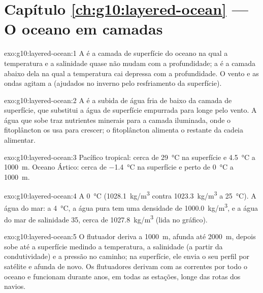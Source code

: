 \section*{Capítulo \ref{ch:g10:layered-ocean} --- O oceano em camadas}

\begin{solution}{exo:g10:layered-ocean:1}
A  é a camada de superfície do oceano na qual a
temperatura e a salinidade quase não mudam com a profundidade; a 
é a camada abaixo dela na qual a temperatura cai depressa com a
profundidade. O vento e as ondas agitam a  (ajudados no
inverno pelo resfriamento da superfície).
\end{solution}

\begin{solution}{exo:g10:layered-ocean:2}
A  é a subida de água fria de baixo da camada de superfície,
que substitui a água de superfície empurrada para longe pelo vento. A água
que sobe traz nutrientes minerais para a camada iluminada, onde o
fitoplâncton os usa para crescer; o fitoplâncton alimenta o restante da
cadeia alimentar.
\end{solution}

\begin{solution}{exo:g10:layered-ocean:3}
Pacífico tropical: cerca de \qty{29}{\degreeCelsius} na superfície e
\qty{4.5}{\degreeCelsius} a \qty{1000}{m}. Oceano Ártico: cerca de
\qty{-1.4}{\degreeCelsius} na superfície e perto de
\qty{0}{\degreeCelsius} a \qty{1000}{m}.
\end{solution}

\begin{solution}{exo:g10:layered-ocean:4}
A \qty{0}{\degreeCelsius} (\qty{1028.1}{kg/m^3} contra \qty{1023.3}{kg/m^3}
a \qty{25}{\degreeCelsius}). A água do mar: a \qty{4}{\degreeCelsius}, a água
pura tem uma densidade de \qty{1000.0}{kg/m^3}, e a água do mar de
salinidade 35, cerca de \qty{1027.8}{kg/m^3} (lida no gráfico).
\end{solution}

\begin{solution}{exo:g10:layered-ocean:5}
O flutuador deriva a \qty{1000}{m}, afunda até \qty{2000}{m}, depois sobe
até a superfície medindo a temperatura, a salinidade (a partir da
condutividade) e a pressão no caminho; na superfície, ele envia o seu perfil
por satélite e afunda de novo. Os flutuadores derivam com as correntes por
todo o oceano e funcionam durante anos, em todas as estações, longe das
rotas dos navios.
\end{solution}

